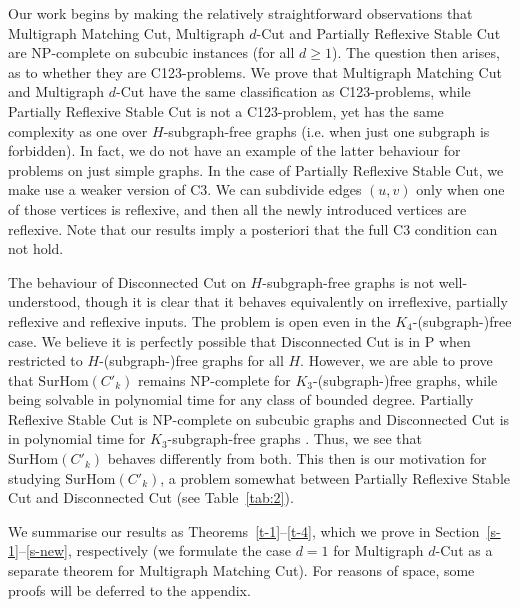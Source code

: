 \documentclass[a4paper,UKenglish,cleveref, autoref,thm-restate]{lipics-v2021}
\newcommand{\SurHom}{\ensuremath{\mathrm{SurHom}}}
\begin{document}
 
Our work begins by making the relatively straightforward observations that {\sc Multigraph Matching Cut}, {\sc Multigraph $d$-Cut} and {\sc Partially Reflexive Stable Cut} are NP-complete on subcubic instances (for all $d\geq 1$). The question then arises, as to whether they are C123-problems. We prove that {\sc Multigraph Matching Cut} and {\sc Multigraph $d$-Cut} have the same classification as C123-problems, while {\sc Partially Reflexive Stable Cut} is not a C123-problem, yet has the same complexity as one over $H$-subgraph-free graphs (\mbox{i.e.} when just one subgraph is forbidden). In fact, we do not have an example of the latter behaviour for problems on just simple graphs. In the case of {\sc Partially Reflexive Stable Cut}, we make use a weaker version of C3. We can subdivide edges $(u,v)$ only when one of those vertices is reflexive, and then all the newly introduced vertices are reflexive. Note that our results imply a posteriori that the full C3 condition can not hold.

The behaviour of {\sc Disconnected Cut} on $H$-subgraph-free graphs is not well-understood, though it is clear that it behaves equivalently on irreflexive, partially reflexive and reflexive inputs. The problem is open even in the $K_4$-(subgraph-)free case. We believe it is perfectly possible that {\sc Disconnected Cut} is in P when restricted to $H$-(subgraph-)free graphs for all $H$. However, we are able to prove that $\SurHom(C'_k)$ remains NP-complete for $K_{3}$-(subgraph-)free graphs, while being solvable in polynomial time for any class of bounded degree. {\sc Partially Reflexive Stable Cut} is NP-complete on subcubic graphs and {\sc Disconnected Cut} is in polynomial time for $K_3$-subgraph-free graphs \cite{FleischnerMujuniPaulusmaSzeider}. Thus, we see that $\SurHom(C'_k)$ behaves differently from both. This then is our motivation for studying $\SurHom(C'_k)$, a problem somewhat between {\sc Partially Reflexive Stable Cut} and {\sc Disconnected Cut} (see Table~\ref{tab:2}).

We summarise our results as Theorems~\ref{t-1}--\ref{t-4}, which we prove in Section~\ref{s-1}--\ref{s-new}, respectively (we formulate the case $d=1$ for {\sc Multigraph $d$-Cut}
as a separate theorem for {\sc Multigraph Matching Cut}). For reasons of space, some proofs will be deferred to the appendix.
\end{document}
